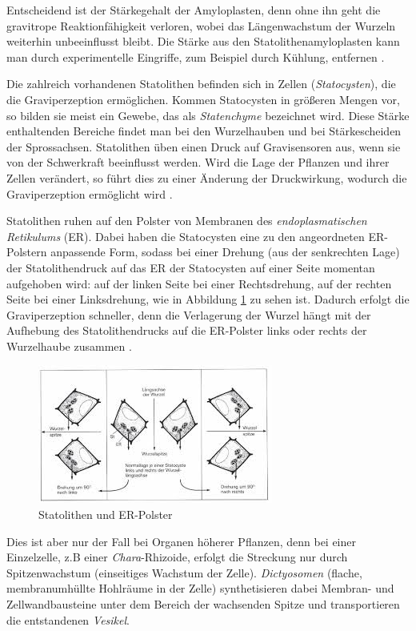 \documentclass[
a4paper, 
11pt, 
ngerman,
listof=totoc,
bibliography=totocnumbered,
abstracton
]{scrreprt}
\begin{document}
Entscheidend ist der Stärkegehalt  der Amyloplasten, denn ohne ihn geht die gravitrope Reaktionfähigkeit verloren, wobei das Längenwachstum der Wurzeln weiterhin unbeeinflusst bleibt.
Die Stärke aus den Statolithenamyloplasten kann man durch experimentelle Eingriffe, zum Beispiel durch Kühlung, entfernen \parencite[452]{Strasburger}.

Die zahlreich vorhandenen Statolithen befinden sich in Zellen (\emph{Statocysten}), die die Graviperzeption ermöglichen. Kommen Statocysten in größeren Mengen vor, so bilden sie meist ein Gewebe, das als \emph{Statenchyme} bezeichnet wird.
Diese Stärke enthaltenden Bereiche findet man bei den Wurzelhauben und bei Stärkescheiden der Sprossachsen.  
Statolithen üben einen Druck auf Gravisensoren aus, wenn sie von der Schwerkraft beeinflusst werden. Wird die Lage der Pflanzen und ihrer Zellen verändert, so führt dies zu einer Änderung der Druckwirkung, wodurch die Graviperzeption ermöglicht wird \parencite[501f]{Nultsch}.

Statolithen ruhen auf den {\glqq Polster\grqq} von Membranen des \emph{endoplasmatischen Retikulums} (ER). Dabei haben die Statocysten eine zu den angeordneten ER-Polstern anpassende Form, sodass bei einer Drehung (aus der senkrechten Lage) der Statolithendruck auf das ER der Statocysten auf einer Seite momentan aufgehoben wird: auf der linken Seite bei einer Rechtsdrehung, auf der rechten Seite bei einer Linksdrehung, wie in Abbildung \ref{Graviperzeption} \parencite[533]{Graviperzeption} zu sehen ist.
Dadurch erfolgt die Graviperzeption schneller, denn die Verlagerung der Wurzel hängt  mit der Aufhebung des Statolithendrucks auf die ER-Polster links oder rechts der Wurzelhaube zusammen \parencite[531f]{Luettge}. 

 \begin{figure}[H]
 	\centering 
 	\includegraphics[width = 0.5\linewidth]{bilder/Graviperzeption.jpeg}
 	\caption{Statolithen und ER-Polster  \label{Graviperzeption}}
 \end{figure} 

Dies ist aber nur der Fall bei Organen höherer Pflanzen, denn bei einer Einzelzelle, z.B einer \emph{Chara}-Rhizoide, erfolgt die Streckung nur durch Spitzenwachstum (einseitiges Wachstum der Zelle).
\emph{Dictyosomen} (flache, membranumhüllte Hohlräume in der Zelle) synthetisieren dabei Membran- und Zellwandbausteine unter dem Bereich der wachsenden Spitze und transportieren  die entstandenen \emph{Vesikel}.
\end{document}
